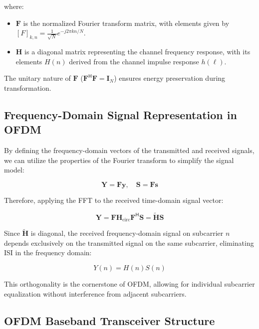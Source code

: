 where:
\begin{itemize}
    \item \(\mathbf{F}\) is the normalized Fourier transform matrix, with elements given by \([F]_{k,n} = \frac{1}{\sqrt{N}} e^{-j2\pi kn / N}\).
    \item \(\mathbf{H}\) is a diagonal matrix representing the channel frequency response, with its elements \(H(n)\) derived from the channel impulse response \(h(\ell)\).
\end{itemize}

The unitary nature of \(\mathbf{F}\) (\(\mathbf{F}^\mathsf{H}\mathbf{F} = \mathbf{I}_N\)) ensures energy preservation during transformation.

\subsection*{Frequency-Domain Signal Representation in OFDM}

By defining the frequency-domain vectors of the transmitted and received signals, we can utilize the properties of the Fourier transform to simplify the signal model:

\begin{equation}
    \mathbf{Y} = \mathbf{F} \mathbf{y}, \quad \mathbf{S} = \mathbf{F} \mathbf{s}
\end{equation}

Therefore, applying the FFT to the received time-domain signal vector:

\begin{equation}
    \mathbf{Y} = \mathbf{F} \mathbf{H}_{\text{circ}} \mathbf{F}^\mathsf{H} \mathbf{S} = \mathbf{\tilde{H}} \mathbf{S}
\end{equation}

Since \(\mathbf{\tilde{H}}\) is diagonal, the received frequency-domain signal on subcarrier \(n\) depends exclusively on the transmitted signal on the same subcarrier, eliminating ISI in the frequency domain:

\begin{equation}
    Y(n) = H(n) S(n)
\end{equation}

This orthogonality is the cornerstone of OFDM, allowing for individual subcarrier equalization without interference from adjacent subcarriers.


\subsection*{OFDM Baseband Transceiver Structure}

